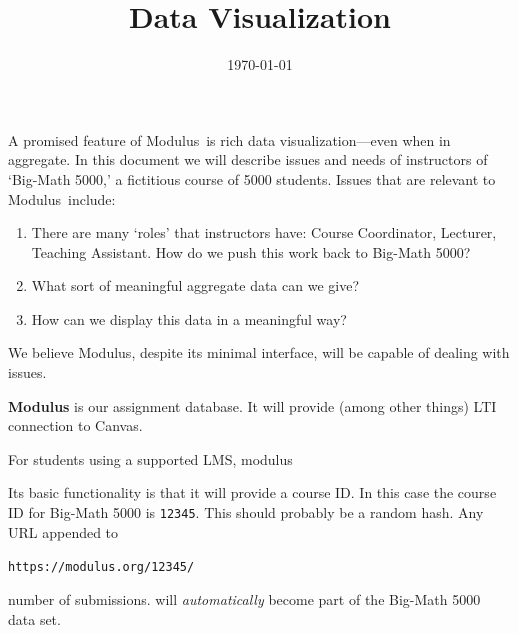 \documentclass{techbrief}
\title{Data\! Visualization}
\date{\today}
\newcommand{\modulus}{\textsf{Modulus}}
\begin{document}
\pagestyle{main}%
\thispagestyle{title}
\lettrine[lines=2]{A}{} promised feature of \modulus\ is rich data
visualization---even when in
aggregate.
In this document we will describe issues and needs of instructors of `Big-Math
5000,' a fictitious course of 5000 students.
Issues that are relevant to \modulus\ include:
\begin{enumerate}
    \item There are many `roles' that instructors have: Course Coordinator,
          Lecturer, Teaching Assistant. How do we push this work back to
          Big-Math 5000?
    \item What sort of meaningful aggregate data can we give?
    \item How can we display this data in a meaningful way?
\end{enumerate}

We believe \modulus, despite its minimal interface, will be capable of dealing
with issues.

\begin{xframe}{\bfseries \modulus} is our assignment database. It will provide
    (among other things) LTI connection to Canvas.

    \begin{center}
    \end{center}
    For students using a supported LMS, modulus

    Its basic functionality is that it will provide a course ID. In this case
    the course ID for Big-Math 5000 is \texttt{12345}. This should probably be
    a
    random hash.
    Any URL appended to
    \begin{center}
        \texttt{https://modulus.org/12345/}
    \end{center}
    number of submissions.
    will \textit{automatically} become part of the Big-Math 5000 data set.
\end{xframe}
\end{document}

